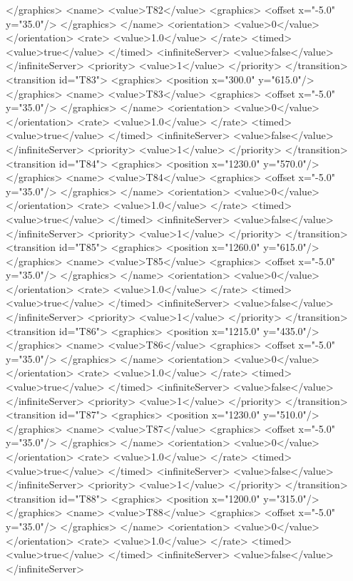 </graphics>
<name>
<value>T82</value>
<graphics>
<offset x="-5.0" y="35.0"/>
</graphics>
</name>
<orientation>
<value>0</value>
</orientation>
<rate>
<value>1.0</value>
</rate>
<timed>
<value>true</value>
</timed>
<infiniteServer>
<value>false</value>
</infiniteServer>
<priority>
<value>1</value>
</priority>
</transition>
<transition id="T83">
<graphics>
<position x="300.0" y="615.0"/>
</graphics>
<name>
<value>T83</value>
<graphics>
<offset x="-5.0" y="35.0"/>
</graphics>
</name>
<orientation>
<value>0</value>
</orientation>
<rate>
<value>1.0</value>
</rate>
<timed>
<value>true</value>
</timed>
<infiniteServer>
<value>false</value>
</infiniteServer>
<priority>
<value>1</value>
</priority>
</transition>
<transition id="T84">
<graphics>
<position x="1230.0" y="570.0"/>
</graphics>
<name>
<value>T84</value>
<graphics>
<offset x="-5.0" y="35.0"/>
</graphics>
</name>
<orientation>
<value>0</value>
</orientation>
<rate>
<value>1.0</value>
</rate>
<timed>
<value>true</value>
</timed>
<infiniteServer>
<value>false</value>
</infiniteServer>
<priority>
<value>1</value>
</priority>
</transition>
<transition id="T85">
<graphics>
<position x="1260.0" y="615.0"/>
</graphics>
<name>
<value>T85</value>
<graphics>
<offset x="-5.0" y="35.0"/>
</graphics>
</name>
<orientation>
<value>0</value>
</orientation>
<rate>
<value>1.0</value>
</rate>
<timed>
<value>true</value>
</timed>
<infiniteServer>
<value>false</value>
</infiniteServer>
<priority>
<value>1</value>
</priority>
</transition>
<transition id="T86">
<graphics>
<position x="1215.0" y="435.0"/>
</graphics>
<name>
<value>T86</value>
<graphics>
<offset x="-5.0" y="35.0"/>
</graphics>
</name>
<orientation>
<value>0</value>
</orientation>
<rate>
<value>1.0</value>
</rate>
<timed>
<value>true</value>
</timed>
<infiniteServer>
<value>false</value>
</infiniteServer>
<priority>
<value>1</value>
</priority>
</transition>
<transition id="T87">
<graphics>
<position x="1230.0" y="510.0"/>
</graphics>
<name>
<value>T87</value>
<graphics>
<offset x="-5.0" y="35.0"/>
</graphics>
</name>
<orientation>
<value>0</value>
</orientation>
<rate>
<value>1.0</value>
</rate>
<timed>
<value>true</value>
</timed>
<infiniteServer>
<value>false</value>
</infiniteServer>
<priority>
<value>1</value>
</priority>
</transition>
<transition id="T88">
<graphics>
<position x="1200.0" y="315.0"/>
</graphics>
<name>
<value>T88</value>
<graphics>
<offset x="-5.0" y="35.0"/>
</graphics>
</name>
<orientation>
<value>0</value>
</orientation>
<rate>
<value>1.0</value>
</rate>
<timed>
<value>true</value>
</timed>
<infiniteServer>
<value>false</value>
</infiniteServer>
